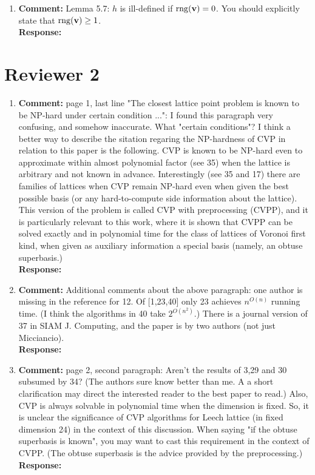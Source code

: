 \documentclass[a4paper,10pt]{article}
\begin{document}
\begin{enumerate}
\item\textbf{Comment:} 
Lemma 5.7: $h$ is ill-defined if $\operatorname{rng}(\mathbf{v}) = 0$.  You should explicitly state that $\operatorname{rng}(\mathbf{v}) \geq 1$.
\\\textbf{Response:}


\end{enumerate}


\section*{Reviewer 2}\label{sec:reviewer-2}

\begin{enumerate}
\item\textbf{Comment:}  
page 1, last line "The closest lattice point problem is known to be NP-hard under certain condition ...": I found this paragraph very confusing, and somehow inaccurate. What "certain conditions"? I think a better way to describe the sitation regaring the NP-hardness of CVP in relation to this paper is the following. CVP is known to be NP-hard even to approximate within almost polynomial factor (see 35) when the lattice is arbitrary and not known in advance. Interestingly (see 35 and 17) there are families of lattices when CVP remain NP-hard even when given the best possible basis (or any hard-to-compute side information about the lattice). This version of the problem is called CVP with preprocessing (CVPP), and it is particularly relevant to this work, where it is shown that CVPP can be solved exactly and in polynomial time for the class of lattices of Voronoi first kind, when given as auxiliary information a special basis (namely, an obtuse superbasis.) 
\\\textbf{Response:}

\item\textbf{Comment:}  
Additional comments about the above paragraph: one author is missing in the reference for 12. Of [1,23,40] only 23 achieves $n^{O(n)}$ running time. (I think the algorithms in 40 take $2^{O(n^2)}$.) There is a journal version of 37 in SIAM J. Computing, and the paper is by two authors (not just Micciancio). 
\\\textbf{Response:}

\item\textbf{Comment:}  
page 2, second paragraph: Aren't the results of 3,29 and 30 subsumed by 34? (The authors sure know better than me. A a short clarification may direct the interested reader to the best paper to read.) Also, CVP is always solvable in polynomial time when the dimension is fixed. So, it is unclear the significance of CVP algorithms for Leech lattice (in fixed dimension 24) in the context of this discussion. 
When saying "if the obtuse superbasis is known", you may want to cast this requirement in the context of CVPP. (The obtuse superbasis is the advice provided by the preprocessing.) 
\\\textbf{Response:}


\end{enumerate}
\end{document}
